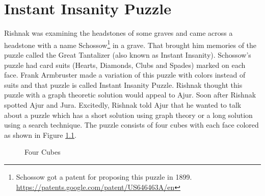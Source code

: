 \chapter{Instant Insanity Puzzle}

Rishnak was examining the headstones of some graves and came across a headstone with a name Schossow\footnote{ Schossow got a patent for proposing this puzzle in 1899. \url{https://patents.google.com/patent/US646463A/en} }  in a grave. That brought him memories of the puzzle called the Great Tantalizer (also known as Instant Insanity). Schossow's puzzle had card suits (Hearts, Diamonds, Clubs and Spades) marked on each face. Frank Armbruster made a variation of this puzzle with colors instead of suits and that puzzle is called Instant Insanity Puzzle.
Rishnak thought this puzzle with a graph theoretic solution would appeal to Ajur. Soon after Rishnak spotted Ajur and Jura. Excitedly, Rishnak told Ajur that he wanted to talk about a puzzle which has a short solution using graph theory or a long solution using a search technique. The puzzle consists of four cubes with each face colored as shown in Figure \ref{22p1}. 
\begin{figure}
\begin{center}
\caption{ Four Cubes}\label{22p1}
\end{center}
\end{figure}

